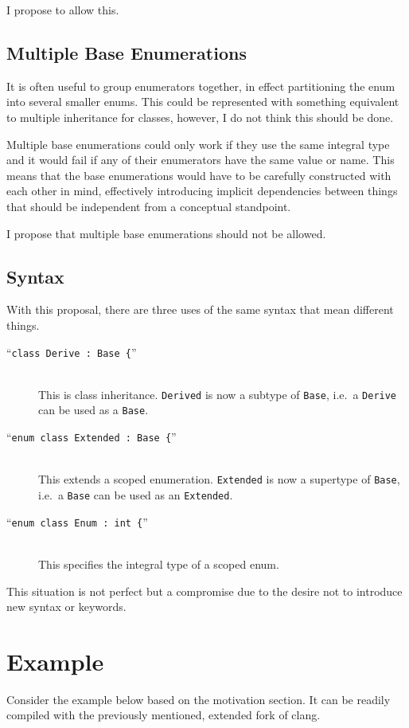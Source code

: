 \documentclass{scrartcl}
\begin{document}
I propose to allow this.

\subsection{Multiple Base Enumerations}
It is often useful to group enumerators together, in effect partitioning the
enum into several smaller enums.
This could be represented with something equivalent to multiple inheritance for
classes, however, I do not think this should be done.

Multiple base enumerations could only work if they use the same integral type
and it would fail if any of their enumerators have the same value or name.
This means that the base enumerations would have to be carefully constructed
with each other in mind, effectively introducing implicit dependencies between
things that should be independent from a conceptual standpoint.

I propose that multiple base enumerations should not be allowed.

\subsection{Syntax}
With this proposal, there are three uses of the same syntax that mean different things.
\begin{description}
\item[``\texttt{class\ Derive\ :\ Base\ \{}'']\hfill\\This is class inheritance. \texttt{Derived} is now a subtype of \texttt{Base}, i.e.\ a \texttt{Derive} can be used as a \texttt{Base}.
\item[``\texttt{enum class\ Extended\ :\ Base\ \{}'']\hfill\\ This extends a scoped enumeration. \texttt{Extended} is now a supertype of \texttt{Base}, i.e.\ a \texttt{Base} can be used as an \texttt{Extended}.
\item[``\texttt{enum class\ Enum\ :\ int\ \{}'']\hfill\\ This specifies the integral type of a scoped enum.
\end{description}

\noindent
This situation is not perfect but a compromise due to the desire not to introduce new syntax or keywords.

\section{Example}
Consider the example below based on the motivation section.
It can be readily compiled with the previously mentioned, extended fork of clang.
\end{document}
